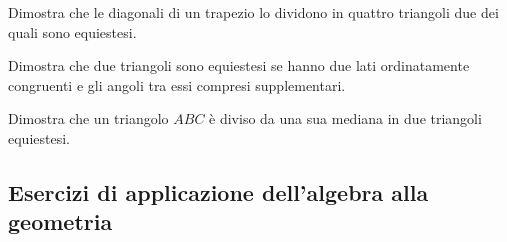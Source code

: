 \begin{multicols}{2}
\begin{esercizio}
\label{ese:7.7}
Dimostra che le diagonali di un trapezio lo dividono in quattro triangoli due dei quali sono equiestesi.
\end{esercizio}

\begin{esercizio}
\label{ese:7.8}
Dimostra che due triangoli sono equiestesi se hanno due lati ordinatamente congruenti e gli angoli tra essi compresi supplementari.
\end{esercizio}

\begin{esercizio}
\label{ese:7.9}
Dimostra che un triangolo $ABC$ è diviso da una sua mediana in due triangoli equiestesi.
\end{esercizio}

\end{multicols}

\subsection{Esercizi di applicazione dell'algebra alla geometria}

